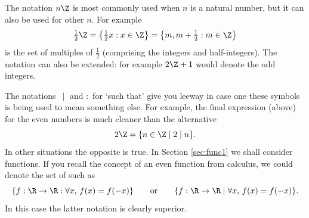\noindent The notation $n\Z$ is most commonly used when $n$ is a natural number, but it can also be used for other $n$. For example
\[\tfrac 12\Z=\left\{\tfrac 12x:x\in\Z\right\}=\left\{m,m+\tfrac 12:m\in\Z\right\}\]
is the set of multiples of $\frac 12$ (comprising the integers and half-integers). The notation can also be extended: for example $2\Z+1$ would denote the odd integers.

\begin{aside}

The notations $\,\mid$ and $:$ for `such that' give you leeway in case one these symbols is being used to mean something else. For example, the final expression (above) for the even numbers is much cleaner than the alternative
\[2\Z=\{n\in\Z\mid 2\mid n\}.\]
In other situations the opposite is true. In Section \ref{sec:func1} we shall consider functions. If you recall the concept of an even function from calculus, we could denote the set of such as
\[\{f:\R\to\R:\forall x,\,f(x)=f(-x)\}\qquad\text{or}\qquad\{f:\R\to\R\mid \forall x,\,f(x)=f(-x)\}.\]
In this case the latter notation is clearly superior.
\end{aside}

